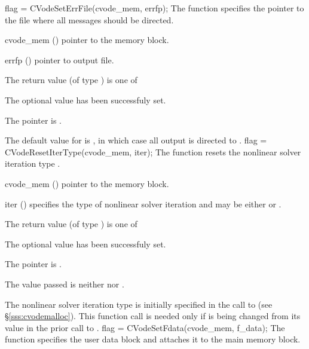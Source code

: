 {
flag = CVodeSetErrFile(cvode\_mem, errfp);
}
{
  The function  specifies the pointer to the file
  where all {\cvode} messages should be directed.
}
{
  \begin{args}
  \item[cvode\_mem] ()
    pointer to the {\cvode} memory block.
  \item[errfp] ()
    pointer to output file.
  \end{args}
}
{
  The return value  (of type ) is one of
  \begin{args}
  \item[\Id{SUCCESS}] 
    The optional value has been successfuly set.
  \item[\Id{CVS\_NO\_MEM}]
    The  pointer is .
  \end{args}
}
{
  The default value for  is , in which case
  all output is directed to .
}
{
flag = CVodeResetIterType(cvode\_mem, iter);
}
{
  The function  resets the nonlinear solver
  iteration type .
}
{
  \begin{args}
  \item[cvode\_mem] ()
    pointer to the {\cvode} memory block.
  \item[iter] ()
    specifies the type of nonlinear solver iteration and may be
    either  or . 
  \end{args}
}
{
  The return value  (of type ) is one of
  \begin{args}
  \item[\Id{SUCCESS}] 
    The optional value has been successfuly set.
  \item[\Id{CVS\_NO\_MEM}]
    The  pointer is .
  \item[\Id{CVS\_ILL\_INPUT}]
    The  value passed is neither  nor .
  \end{args}
}
{
  The nonlinear solver iteration type is initially specified in the call
  to  (see \S\ref{sss:cvodemalloc}). This function call is
  needed only if  is being changed from its value in the prior call 
  to .
}
{
  flag = CVodeSetFdata(cvode\_mem, f\_data);
}
{
  The function  specifies the user data block 
  and attaches it to the main {\cvode} memory block.
}
